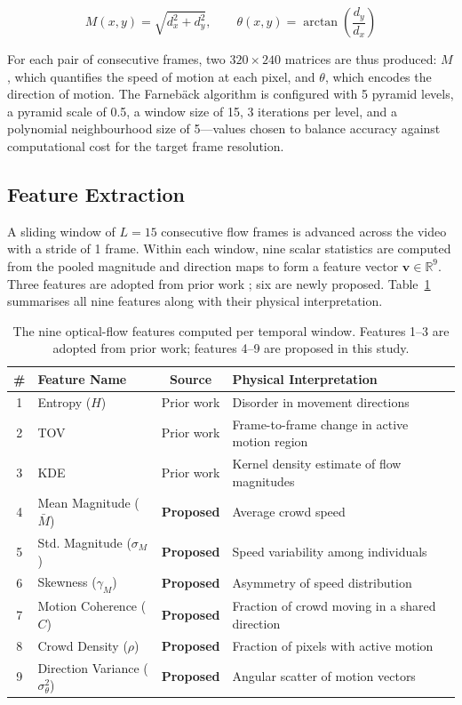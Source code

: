 \begin{equation}
  M(x,y) = \sqrt{d_x^2 + d_y^2}, \qquad \theta(x,y) = \arctan\!\left(\frac{d_y}{d_x}\right)
  \label{eq:polar}
\end{equation}

For each pair of consecutive frames, two $320 \times 240$ matrices are thus produced: $M$, which quantifies the speed of motion at each pixel, and $\theta$, which encodes the direction of motion. The Farneb\"{a}ck algorithm is configured with 5 pyramid levels, a pyramid scale of 0.5, a window size of 15, 3 iterations per level, and a polynomial neighbourhood size of 5---values chosen to balance accuracy against computational cost for the target frame resolution.

\subsection{Feature Extraction}

A sliding window of $L = 15$ consecutive flow frames is advanced across the video with a stride of 1 frame. Within each window, nine scalar statistics are computed from the pooled magnitude and direction maps to form a feature vector $\mathbf{v} \in \mathbb{R}^9$. Three features are adopted from prior work \cite{cobparro2021stampede}; six are newly proposed. Table~\ref{tab:features} summarises all nine features along with their physical interpretation.

\begin{table}[!t]
\centering
\caption{The nine optical-flow features computed per temporal window. Features 1--3 are adopted from prior work; features 4--9 are proposed in this study.}
\label{tab:features}
\footnotesize
\begin{tabular}{clcl}
\toprule
\textbf{\#} & \textbf{Feature Name} & \textbf{Source} & \textbf{Physical Interpretation} \\
\midrule
1 & Entropy ($H$)         & Prior work & Disorder in movement directions \\
2 & TOV                    & Prior work & Frame-to-frame change in active motion region \\
3 & KDE                    & Prior work & Kernel density estimate of flow magnitudes \\
4 & Mean Magnitude ($\bar{M}$) & \textbf{Proposed} & Average crowd speed \\
5 & Std. Magnitude ($\sigma_M$) & \textbf{Proposed} & Speed variability among individuals \\
6 & Skewness ($\gamma_M$)  & \textbf{Proposed} & Asymmetry of speed distribution \\
7 & Motion Coherence ($C$) & \textbf{Proposed} & Fraction of crowd moving in a shared direction \\
8 & Crowd Density ($\rho$) & \textbf{Proposed} & Fraction of pixels with active motion \\
9 & Direction Variance ($\sigma^2_\theta$) & \textbf{Proposed} & Angular scatter of motion vectors \\
\bottomrule
\end{tabular}
\end{table}

